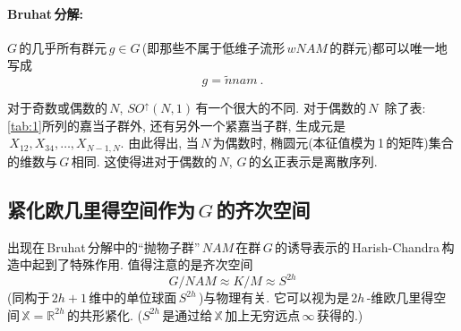 \paragraph*{Bruhat\,分解:} $G\,$的几乎所有群元$\,g\in G$\,(即那些不属于低维子流形$\,wNAM\,$的群元)都可以唯一地写成
\begin{equation}
    g=\tilde{n}nam \:. \label{1.13}
\end{equation}

\begin{remark}
对于奇数或偶数的$\,N$, $SO^{\uparrow}(N,1)\,$有一个很大的不同. 对于偶数的$\,N\,$ 除了表:\ref{tab:1}所列的嘉当子群外, 还有另外一个紧嘉当子群, 生成元是$\,X_{12},X_{34},\ldots,X_{N-1,N}$. 由此得出, 当$\,N\,$为偶数时, 椭圆元(本征值模为\,1\,的矩阵)集合的维数与$\,G\,$相同. 这使得进对于偶数的$\,N$, $G\,$的幺正表示是离散序列.
\end{remark}

\subsection{紧化欧几里得空间作为$\,G\,$的齐次空间}

出现在\,Bruhat\,分解中的``抛物子群''$\,NAM\,$在群$\,G\,$的诱导表示的\,Harish-Chandra\,构造中起到了特殊作用. 值得注意的是齐次空间
\begin{equation}
    G/NAM \approx K/M \approx S^{2h} \label{1.14}
\end{equation}
(同构于$\,2h{+}1\,$维中的单位球面$\,S^{2h}\,$)与物理有关. 它可以视为是\,$2h$\,-维欧几里得空间$\,\mathbb{X}=\mathbb{R}^{2h}$\,的共形紧化. ($S^{2h}\,$是通过给$\,\mathbb{X}\,$加上无穷远点$\,\infty\,$获得的.)

